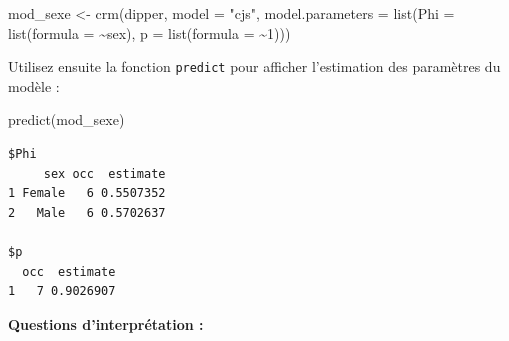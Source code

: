 \documentclass[
  french,
  a4paper,
  DIV=11,
  numbers=noendperiod,
  oneside]{scrreprt}
\newenvironment{Shaded}{}{}
\newcommand{\AttributeTok}[1]{\textcolor[rgb]{0.84,0.23,0.29}{#1}}
\newcommand{\DecValTok}[1]{\textcolor[rgb]{0.00,0.36,0.77}{#1}}
\newcommand{\FunctionTok}[1]{\textcolor[rgb]{0.44,0.26,0.76}{#1}}
\newcommand{\NormalTok}[1]{\textcolor[rgb]{0.14,0.16,0.18}{#1}}
\newcommand{\OtherTok}[1]{\textcolor[rgb]{0.44,0.26,0.76}{#1}}
\newcommand{\SpecialCharTok}[1]{\textcolor[rgb]{0.00,0.36,0.77}{#1}}
\newcommand{\StringTok}[1]{\textcolor[rgb]{0.01,0.18,0.38}{#1}}
\begin{document}
\begin{Shaded}
\begin{Highlighting}[]
\NormalTok{mod\_sexe }\OtherTok{\textless{}{-}} \FunctionTok{crm}\NormalTok{(dipper, }\AttributeTok{model =} \StringTok{"cjs"}\NormalTok{, }
                \AttributeTok{model.parameters =} \FunctionTok{list}\NormalTok{(}\AttributeTok{Phi =} \FunctionTok{list}\NormalTok{(}\AttributeTok{formula =} \SpecialCharTok{\textasciitilde{}}\NormalTok{sex), }
                                        \AttributeTok{p   =} \FunctionTok{list}\NormalTok{(}\AttributeTok{formula =} \SpecialCharTok{\textasciitilde{}}\DecValTok{1}\NormalTok{)))                                   }
\end{Highlighting}
\end{Shaded}

Utilisez ensuite la fonction \texttt{predict} pour afficher l'estimation
des paramètres du modèle :

\begin{Shaded}
\begin{Highlighting}[]
\FunctionTok{predict}\NormalTok{(mod\_sexe)   }
\end{Highlighting}
\end{Shaded}

\begin{verbatim}
$Phi
     sex occ  estimate
1 Female   6 0.5507352
2   Male   6 0.5702637

$p
  occ  estimate
1   7 0.9026907
\end{verbatim}

\textbf{Questions d'interprétation :}
\end{document}

